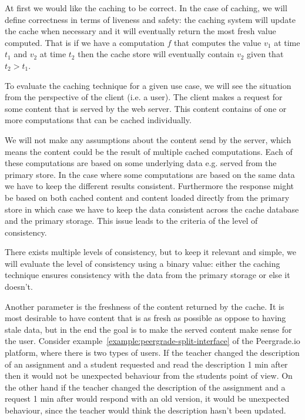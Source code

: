 
At first we would like the caching to be correct. In the case of caching, we will define correctness in terms of liveness and safety: the caching system will update the cache when necessary and it will eventually return the most fresh value computed. That is if we have a computation $f$ that computes the value $v_1$ at time $t_1$ and $v_2$ at time $t_2$ then the cache store will eventually contain $v_2$ given that $t_2 > t_1$.

To evaluate the caching technique for a given use case, we will see the situation from the perspective of the client (i.e. a user). The client makes a request for some content that is served by the web server. This content contains of one or more computations that can be cached individually.

We will not make any assumptions about the content send by the server, which means the content could be the result of multiple cached computations. Each of these computations are based on some underlying data e.g. served from the primary store. In the case where some computations are based on the same data we have to keep the different results consistent. Furthermore the response might be based on both cached content and content loaded directly from the primary store in which case we have to keep the data consistent across the cache database and the primary storage. This issue leads to the criteria of the level of consistency.

There exists multiple levels of consistency, but to keep it relevant and simple, we will evaluate the level of consistency using a binary value: either the caching technique ensures consistency with the data from the primary storage or else it doesn't.

Another parameter is the freshness of the content returned by the cache. It is most desirable to have content that is as fresh as possible as oppose to having stale data, but in the end the goal is to make the served content make sense for the user. Consider example~\ref{example:peergrade-split-interface} of the Peergrade.io platform, where there is two types of users. If the teacher changed the description of an assignment and a student requested and read the description 1 min after then it would not be unexpected behaviour from the students point of view. On the other hand if the teacher changed the description of the assignment and a request 1 min after would respond with an old version, it would be unexpected behaviour, since the teacher would think the description hasn't been updated.

